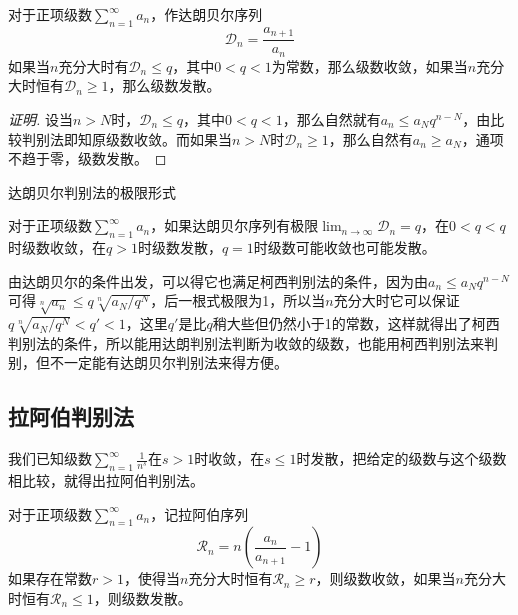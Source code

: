 \begin{theorem}[达朗贝尔判别法]
  对于正项级数$\sum_{n=1}^{\infty}a_n$，作达朗贝尔序列
  \[ \mathcal{D}_n = \frac{a_{n+1}}{a_n} \]
  如果当$n$充分大时有$\mathcal{D}_n \leqslant q$，其中$0<q<1$为常数，那么级数收敛，如果当$n$充分大时恒有$\mathcal{D}_n \geqslant 1$，那么级数发散。
\end{theorem}

\begin{proof}[证明]
  设当$n>N$时，$\mathcal{D}_n \leqslant q$，其中$0<q<1$，那么自然就有$a_n \leqslant a_N q^{n-N}$，由比较判别法即知原级数收敛。而如果当$n>N$时$\mathcal{D}_n \geqslant 1$，那么自然有$a_n \geqslant a_N$，通项不趋于零，级数发散。
\end{proof}

达朗贝尔判别法的极限形式
\begin{inference}
  对于正项级数$\sum_{n=1}^{\infty}a_n$，如果达朗贝尔序列有极限$\lim_{n \to \infty} \mathcal{D}_n = q$，在$0<q<q$时级数收敛，在$q>1$时级数发散，$q=1$时级数可能收敛也可能发散。
\end{inference}

由达朗贝尔的条件出发，可以得它也满足柯西判别法的条件，因为由$a_n \leqslant a_N q^{n-N}$可得$\sqrt[n]{a_n} \leqslant q \sqrt[n]{a_N/q^N}$，后一根式极限为1，所以当$n$充分大时它可以保证$q \sqrt[n]{a_N/q^N}<q'<1$，这里$q'$是比$q$稍大些但仍然小于1的常数，这样就得出了柯西判别法的条件，所以能用达朗判别法判断为收敛的级数，也能用柯西判别法来判别，但不一定能有达朗贝尔判别法来得方便。

\subsection{拉阿伯判别法}
\label{sec:raabe-method-about-positive-series}

我们已知级数$\sum_{n=1}^{\infty}\frac{1}{n^s}$在$s>1$时收敛，在$s \leqslant 1$时发散，把给定的级数与这个级数相比较，就得出拉阿伯判别法。

\begin{theorem}[拉阿伯判别法]
  对于正项级数$\sum_{n=1}^{\infty}a_n$，记拉阿伯序列
  \[ \mathcal{R}_n = n \left( \frac{a_n}{a_{n+1}}-1 \right) \]
  如果存在常数$r>1$，使得当$n$充分大时恒有$\mathcal{R}_n \geqslant r$，则级数收敛，如果当$n$充分大时恒有$\mathcal{R}_n \leqslant 1$，则级数发散。
\end{theorem}

